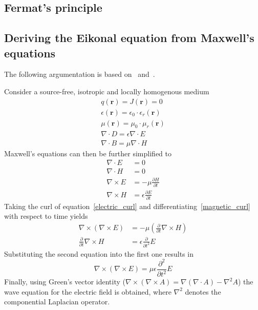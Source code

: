 \subsection{Fermat's principle}










\subsection{Deriving the Eikonal equation from Maxwell's equations}
The following argumentation is based on~\parencite{born_geometrische_1933} and~\parencite{sommerfeld_anwendung_1911}.

Consider a source-free, isotropic and locally homogenous medium
\begin{gather}
    q(\mathbf{r}) = J(\mathbf{r}) = 0 \\
    \epsilon(\mathbf{r}) = \epsilon_0 \cdot \epsilon_r(\mathbf{r}) \\
    \mu(\mathbf{r}) = \mu_0 \cdot \mu_r(\mathbf{r}) \\
    \nabla \cdot D = \epsilon \nabla \cdot E \\
    \nabla \cdot B = \mu \nabla \cdot H 
\end{gather}
Maxwell's equations can then be further simplified to
\begin{align}
    \nabla \cdot E &= 0 \\
    \nabla \cdot H &= 0 \\
    \nabla \times E &= -\mu \frac{\partial H}{\partial t}\label{electric_curl} \\
    \nabla \times H &= \epsilon \frac{\partial E}{\partial t}\label{magnetic_curl}
\end{align}
Taking the curl of equation~\eqref{electric_curl} and differentiating~\eqref{magnetic_curl} with respect to time yields
\begin{align}
    \nabla \times (\nabla \times E) &= -\mu (\frac{\partial}{\partial t} \nabla \times H) \\
    \frac{\partial}{\partial t} \nabla \times H &= \epsilon \frac{\partial}{\partial t^2} E
\end{align}
Substituting the second equation into the first one results in
\begin{equation}
    \nabla \times (\nabla \times E) = \mu \epsilon \frac{\partial^2}{\partial t^2} E
\end{equation}
Finally, using Green's vector identity (\(\nabla \times (\nabla \times A) = \nabla(\nabla \cdot A) - \nabla^2 A\)) the wave equation for the electric field is obtained, where \(\nabla^2\) denotes the componential Laplacian operator.
